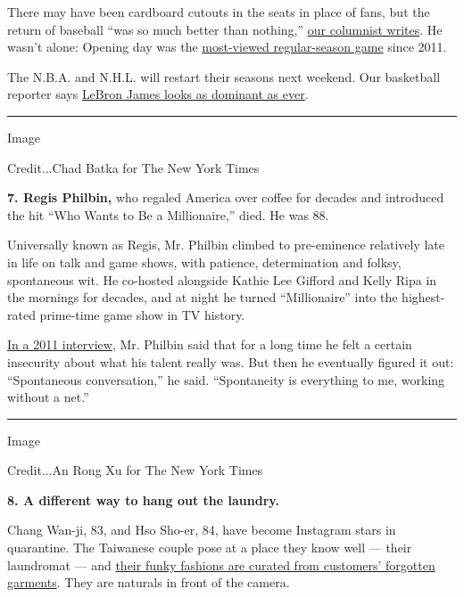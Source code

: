 There may have been cardboard cutouts in the seats in place of fans, but
the return of baseball ``was so much better than nothing,''
\href{https://www.nytimes3xbfgragh.onion/2020/07/24/sports/baseball/mlb-opening-day.html}{our
columnist writes}. He wasn't alone: Opening day was the
\href{https://www.espn.com/mlb/story/_/id/29532370/mlb-opener-was-most-viewed-regular-season-game-2011}{most-viewed
regular-season game} since 2011.

The N.B.A. and N.H.L. will restart their seasons next weekend. Our
basketball reporter says
\href{https://www.nytimes3xbfgragh.onion/2020/07/24/sports/basketball/nba-lebron-james-lakers.html}{LeBron
James looks as dominant as ever}.

\begin{center}\rule{0.5\linewidth}{\linethickness}\end{center}

Image

Credit...Chad Batka for The New York Times

\textbf{7. Regis Philbin,} who regaled America over coffee for decades
and introduced the hit ``Who Wants to Be a Millionaire,'' died. He was
88.

Universally known as Regis, Mr. Philbin climbed to pre-eminence
relatively late in life on talk and game shows, with patience,
determination and folksy, spontaneous wit. He co-hosted alongside Kathie
Lee Gifford and Kelly Ripa in the mornings for decades, and at night he
turned ``Millionaire'' into the highest-rated prime-time game show in TV
history.

\href{https://www.nytimes3xbfgragh.onion/2011/11/15/arts/television/regis-philbin-looks-back-at-a-long-unscripted-career.html}{In
a 2011 interview}, Mr. Philbin said that for a long time he felt a
certain insecurity about what his talent really was. But then he
eventually figured it out: ``Spontaneous conversation,'' he said.
``Spontaneity is everything to me, working without a net.''

\begin{center}\rule{0.5\linewidth}{\linethickness}\end{center}

Image

Credit...An Rong Xu for The New York Times

\textbf{8. A different way to hang out the laundry.}

Chang Wan-ji, 83, and Hso Sho-er, 84, have become Instagram stars in
quarantine. The Taiwanese couple pose at a place they know well ---
their laundromat --- and
\href{https://www.nytimes3xbfgragh.onion/2020/07/24/world/asia/taiwan-octogenarian-couple-instagram-laundry.html}{their
funky fashions are curated from customers' forgotten garments}. They are
naturals in front of the camera.

